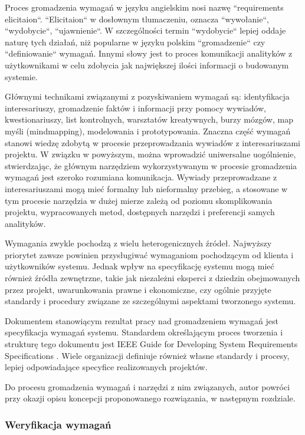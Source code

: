         Proces gromadzenia wymagań w języku angielskim nosi nazwę ``requirements elicitaion``. ``Elicitaion`` w dosłownym tlumaczeniu, oznacza ``wywołanie``, ``wydobycie``, ``ujawnienie``. W szczególności termin ``wydobycie`` lepiej oddaje naturę tych działań, niż popularne w języku polskim ``gromadzenie`` czy ``definiowanie`` wymagań. Innymi słowy jest to proces komunikacji analityków z użytkownikami w celu zdobycia jak największej ilości informacji o budowanym systemie. 

        Głównymi technikami związanymi z pozyskiwaniem wymagań są: identyfikacja interesariuszy, gromadzenie faktów i informacji przy pomocy wywiadów, kwestionariuszy, list kontrolnych, warsztatów kreatywnych, burzy mózgów, map myśli (mindmapping), modelowania i prototypowania. Znaczna część wymagań stanowi wiedzę zdobytą w procesie przeprowadzania wywiadów z interesariuszami projektu. W związku w powyższym, można wprowadzić uniwersalne uogólnienie, stwierdzając, że głównym narzędziem wykorzystywanym w procesie gromadzenia wymagań jest szeroko rozumiana komunikacja. Wywiady przeprowadzane z interesariuszami mogą mieć formalny lub nieformalny przebieg, a stosowane w tym procesie narzędzia w dużej mierze zależą od poziomu skomplikowania projektu, wypracowanych metod, dostępnych narzędzi i preferencji samych analityków. 
        
        Wymagania zwykle pochodzą z wielu heterogenicznych źródeł. Najwyższy priorytet zawsze powinien przysługiwać wymaganiom pochodzącym od klienta i użytkowników systemu. Jednak wpływ na specyfikację systemu mogą mieć również źródła zewnętrzne, takie jak niezależni eksperci z dziedzin obejmowanych przez projekt, uwarunkowania prawne i ekonomiczne, czy ogólnie przyjęte standardy i procedury związane ze szczególnymi aspektami tworzonego systemu.

        Dokumentem stanowiącym rezultat pracy nad gromadzeniem wymagań jest specyfikacja wymagań systemu. Standardem określającym proces tworzenia i strukturę tego dokumentu jest IEEE Guide for Developing System Requirements Specifications \cite{institute1984ieee}. Wiele organizacji definiuje również własne standardy i procesy, lepiej odpowiadające specyfice realizowanych projektów.

        Do procesu gromadzenia wymagań i narzędzi z nim związanych, autor powróci przy okazji opisu koncepcji proponowanego rozwiązania, w następnym rozdziale.

      \subsubsection{Weryfikacja wymagań}

